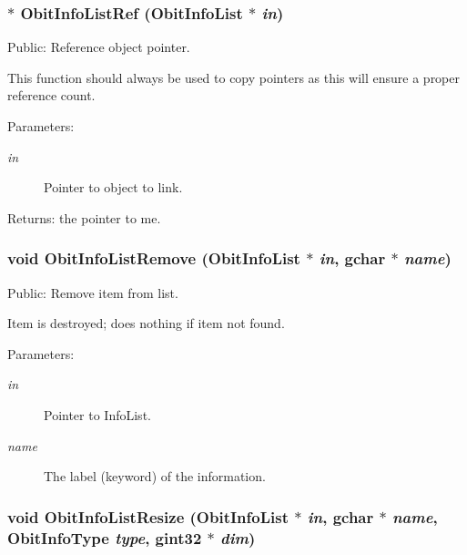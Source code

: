\subsubsection{$\ast$ Obit\-Info\-List\-Ref ({\bf Obit\-Info\-List} $\ast$ {\em in})}\label{ObitInfoList_8h_a3}


Public: Reference object pointer. 

This function should always be used to copy pointers as this will ensure a proper reference count. \begin{Desc}
\item[Parameters:]
\begin{description}
\item[{\em in}]Pointer to object to link. \end{description}
\end{Desc}
\begin{Desc}
\item[Returns:]the pointer to me. \end{Desc}
\subsubsection{\setlength{\rightskip}{0pt plus 5cm}void Obit\-Info\-List\-Remove ({\bf Obit\-Info\-List} $\ast$ {\em in}, gchar $\ast$ {\em name})}\label{ObitInfoList_8h_a18}


Public: Remove item from list. 

Item is destroyed; does nothing if item not found. \begin{Desc}
\item[Parameters:]
\begin{description}
\item[{\em in}]Pointer to Info\-List. \item[{\em name}]The label (keyword) of the information. \end{description}
\end{Desc}
\subsubsection{\setlength{\rightskip}{0pt plus 5cm}void Obit\-Info\-List\-Resize ({\bf Obit\-Info\-List} $\ast$ {\em in}, gchar $\ast$ {\em name}, Obit\-Info\-Type {\em type}, gint32 $\ast$ {\em dim})}\label{ObitInfoList_8h_a19}



